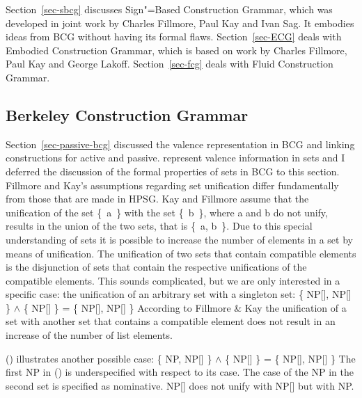 Section~\ref{sec-sbcg} discusses Sign"=Based Construction Grammar, which was developed in joint work
by Charles Fillmore, Paul Kay and Ivan Sag. It embodies ideas from BCG without having its formal flaws. Section~\ref{sec-ECG} deals with
Embodied Construction Grammar, which is based on work by Charles Fillmore, Paul Kay and George
Lakoff. Section~\ref{sec-fcg} deals with Fluid Construction Grammar.


\subsection{Berkeley Construction Grammar}
\label{sec-formal-bcg}

Section~\ref{sec-passive-bcg} discussed the valence representation in BCG and linking constructions for active and
passive.  represent valence information in sets
and I deferred the discussion of the formal properties of sets in BCG to this section.
Fillmore and Kay's assumptions regarding set unification differ fundamentally from those that are
made in HPSG. Kay and Fillmore assume that the unification of the set \{~a~\} with the set  \mbox{\{ b \}},
where a and b do not unify, results in the union of the two sets, that is \{~a, b~\}. Due to this
special understanding of sets it is possible to increase the number of elements in a set by means of
unification. The unification of two sets that contain compatible elements is the disjunction of sets
that contain the respective unifications of the compatible elements. This sounds complicated, but we
are only interested in a specific case: the unification of an arbitrary set with a singleton set:
\ea
\{ NP[], NP[] \} $\wedge$ \{ NP[] \} = \{ NP[], NP[] \}
\z
According to Fillmore \& Kay the unification of a set with another set that contains a compatible
element does not result in an increase of the number of list elements.

\noindent
() illustrates another possible case:
\ea
\{ NP, NP[] \} $\wedge$ \{ NP[] \} = \{ NP[], NP[] \}
\z
The first NP in () is underspecified with respect to its case. The case of the NP in the
second set is specified as nominative. NP[] does not unify with NP[] but with NP.

